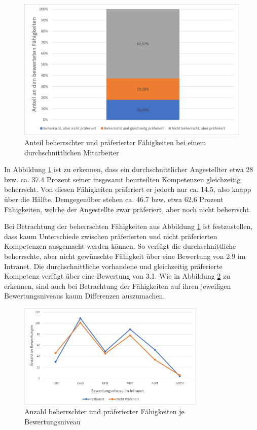 \begin{figure}[h]
	\centering
	\includegraphics[width=1\textwidth]{gfx/auswertung-anteil-an-faehigkeiten.png}
	\caption{Anteil beherrschter und präferierter Fähigkeiten bei einem durchschnittlichen Mitarbeiter}
	\label{fig:ergebnisse:analyse:abb3}
\end{figure}

In Abbildung \ref{fig:ergebnisse:analyse:abb3} ist zu erkennen, dass ein durchschnittlicher Angestellter etwa 28 bzw. ca. 37.4 Prozent seiner insgesamt beurteilten Kompetenzen gleichzeitig beherrscht. Von diesen Fähigkeiten präferiert er jedoch nur ca. 14.5, also knapp über die Hälfte. Demgegenüber stehen ca. 46.7 bzw. etwa 62.6 Prozent Fähigkeiten, welche der Angestellte zwar präferiert, aber noch nicht beherrscht.

Bei Betrachtung der beherrschten Fähigkeiten aus Abbildung \ref{fig:ergebnisse:analyse:abb3} ist festzustellen, dass kaum Unterschiede zwischen präferierten und nicht präferierten Kompetenzen ausgemacht werden können. So verfügt die durchschnittliche beherrschte, aber nicht gewünschte Fähigkeit über eine Bewertung von 2.9 im Intranet. Die durchschnittliche vorhandene und gleichzeitig präferierte Kompetenz verfügt über eine Bewertung von 3.1. Wie in Abbildung \ref{fig:ergebnisse:analyse:abb4} zu erkennen, sind auch bei Betrachtung der Fähigkeiten auf ihren jeweiligen Bewertungsniveaus kaum Differenzen auszumachen.

\begin{figure}[h]
	\centering
	\includegraphics[width=0.8\textwidth]{gfx/bewertungen-je-bewertungsniveau.png}
	\caption{Anzahl beherrschter und präferierter Fähigkeiten je Bewertungsniveau}
	\label{fig:ergebnisse:analyse:abb4}
\end{figure}

